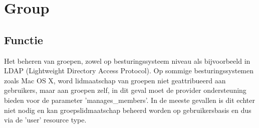 \section{Group}

\subsection{Functie}
Het beheren van groepen, zowel op besturingssysteem niveau als bijvoorbeeld in LDAP (Lightweight Directory Access Protocol). Op sommige besturingssystemen zoals Mac OS X, word lidmaatschap van groepen niet geattribueerd aan gebruikers, maar aan groepen zelf, in dit geval moet de provider ondersteuning bieden voor de parameter 'manages\_members'. In de meeste gevallen is dit echter niet nodig en kan groepslidmaatschap beheerd worden op gebruikersbasis en dus via de 'user' resource type.

